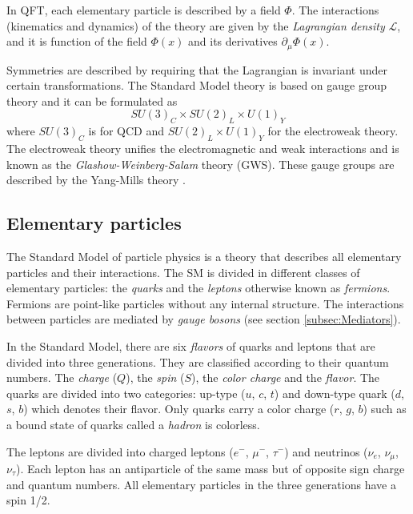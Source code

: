 In QFT, each elementary particle is described by a field $\Phi$. The interactions (kinematics and dynamics) of the theory are given by the \textit{Lagrangian density} $\mathcal{L}$, and it is function of the field $\Phi(x)$ and its derivatives $\partial_{\mu}\Phi(x)$.

Symmetries are described by requiring that the Lagrangian is invariant under certain transformations. The Standard Model theory is based on gauge group theory and it can be formulated as
\begin{equation}
  SU(3)_{C} \times SU(2)_{L} \times U(1)_{Y}
\end{equation}
where $SU(3)_{C}$ is for QCD and $SU(2)_{L} \times U(1)_{Y}$ for the electroweak theory. The electroweak theory unifies the electromagnetic and weak interactions and is known as the \textit{Glashow-Weinberg-Salam} theory (GWS). These gauge groups are described by the Yang-Mills theory \cite{Yang:1954ek}.

\subsection{Elementary particles}

The Standard Model of particle physics is a theory that describes all elementary particles and their interactions. The SM is divided in different classes of elementary particles: the \textit{quarks} and the \textit{leptons} otherwise known as \textit{fermions}. Fermions are point-like particles without any internal structure. The interactions between particles are mediated by \textit{gauge bosons} (see section \ref{subsec:Mediators}).

In the Standard Model, there are six \textit{flavors} of quarks and leptons that are divided into three generations. They are classified according to their quantum numbers. The \textit{charge} ($Q$), the \textit{spin} ($S$), the \textit{color charge} and the \textit{flavor}. The quarks are divided into two categories: up-type ($u$, $c$, $t$) and down-type quark ($d$, $s$, $b$) which denotes their flavor. Only quarks carry a color charge ($r$, $g$, $b$) such as a bound state of quarks called a \textit{hadron} is colorless.

The leptons are divided into charged leptons ($e^-$, $\mu^-$, $\tau^-$) and neutrinos ($\nu_e$, $\nu_{\mu}$, $\nu_{\tau}$). Each lepton has an antiparticle of the same mass but of opposite sign charge and quantum numbers. All elementary particles in the three generations have a spin 1/2.

